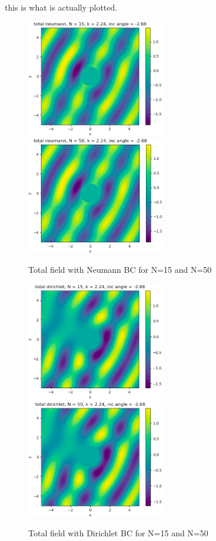 this is what is actually plotted.

\begin{figure}
  \centering
  \includegraphics[width=6cm]{../figures/total_neumann_n15}
  \includegraphics[width=6cm]{../figures/total_neumann_n50}
  \caption{Total field with Neumann BC for N=15 and N=50}
\end{figure}

\begin{figure}
  \centering
  \includegraphics[width=6cm]{../figures/total_dirichlet_n15}
  \includegraphics[width=6cm]{../figures/total_dirichlet_n50}
  \caption{Total field with Dirichlet BC for N=15 and N=50}
\end{figure}


